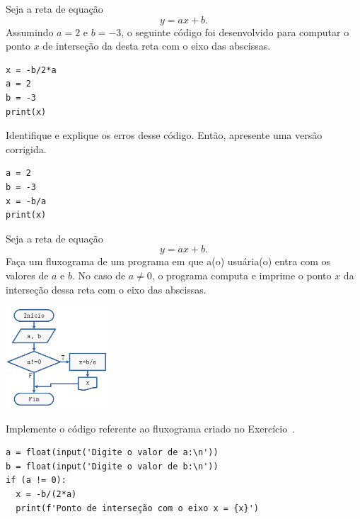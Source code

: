 \begin{exer}
  Seja a reta de equação
  \begin{equation}
    y = ax + b.
  \end{equation}
  Assumindo $a=2$ e $b=-3$, o seguinte código foi desenvolvido para computar o ponto $x$ de interseção da desta reta com o eixo das abscissas.

\begin{lstlisting}
x = -b/2*a
a = 2
b = -3
print(x)
\end{lstlisting}

Identifique e explique os erros desse código. Então, apresente uma versão corrigida.
\end{exer}
\begin{resp}

\begin{lstlisting}
a = 2
b = -3
x = -b/a
print(x)
\end{lstlisting}

\end{resp}

\begin{exer}\label{cap_progest_sec_est:exer:ramifica_reta}
  Seja a reta de equação
  \begin{equation}
    y = ax + b.
  \end{equation}
  Faça um fluxograma de um programa em que a(o) usuária(o) entra com os valores de $a$ e $b$. No caso de $a\neq 0$, o programa computa e imprime o ponto $x$ da interseção dessa reta com o eixo das abscissas.
\end{exer}
\begin{resp}

\includegraphics[width=1.5in]{cap_progest/dados/fig_exer_ramifica_reta/fig.png}
  
\end{resp}

\begin{exer}
  Implemente o código referente ao fluxograma criado no Exercício~.
\end{exer}
\begin{resp}

\begin{lstlisting}
a = float(input('Digite o valor de a:\n'))
b = float(input('Digite o valor de b:\n'))
if (a != 0):
  x = -b/(2*a)
  print(f'Ponto de interseção com o eixo x = {x}')
\end{lstlisting}

\end{resp}

